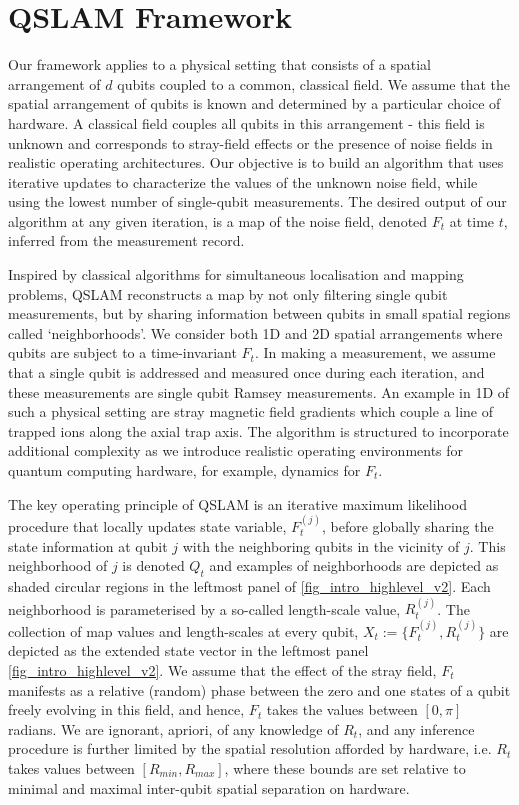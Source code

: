 \section{QSLAM Framework}
Our framework applies to a physical setting that consists of a spatial arrangement of $d$ qubits coupled to a common, classical field. We assume that the spatial arrangement of qubits is known and determined by a particular choice of hardware. A classical field couples all qubits in this arrangement - this field is unknown and corresponds to stray-field effects or the presence of noise fields in realistic operating architectures.  Our objective is to build an algorithm that uses iterative updates to characterize the values of the unknown noise field, while using the lowest number of single-qubit measurements. The desired output of our algorithm at any given iteration, is a map of the noise field, denoted $F_t$ at time $t$, inferred from the measurement record. 

Inspired by classical algorithms for simultaneous localisation and mapping problems, QSLAM reconstructs a map by not only filtering single qubit measurements, but by sharing information between qubits in small spatial regions called `neighborhoods'. We consider both 1D and 2D spatial arrangements where qubits are subject to a time-invariant $F_t$. In making a measurement, we assume that a single qubit is addressed and measured once during each iteration, and these measurements are single qubit Ramsey measurements. An example in 1D of such a physical setting are stray magnetic field gradients which couple a line of trapped ions along the axial trap axis. The algorithm is structured to incorporate additional complexity as we introduce realistic operating environments for quantum computing hardware, for example, dynamics for $F_t$.

The key operating principle of QSLAM is an iterative maximum likelihood procedure that locally updates state variable, $F_t^{(j)}$, before globally sharing the state information at qubit $j$ with the neighboring qubits in the vicinity of $j$. This neighborhood of $j$ is  denoted $Q_t$ and examples of neighborhoods are depicted as shaded circular regions in the leftmost panel of \cref{fig_intro_highlevel_v2}. Each neighborhood is parameterised by a so-called length-scale value, $R_t^{(j)}$.   The collection of map values and length-scales at every qubit, $X_t:=\{F_t^{(j)}, R_t^{(j)}\}$ are depicted as the extended state vector in the leftmost panel \cref{fig_intro_highlevel_v2}.  We assume that the effect of the stray field, $F_t$ manifests as a relative (random) phase between the zero and one states of a qubit freely evolving in this field, and hence, $F_t$ takes the values between $[0, \pi]$ radians. We are ignorant, apriori, of any knowledge of $R_t$, and any inference procedure is further limited by the spatial resolution afforded by hardware, i.e. $R_t$ takes values between $[R_{min}, R_{max}]$, where these bounds are set relative to minimal and maximal inter-qubit spatial separation on hardware.

